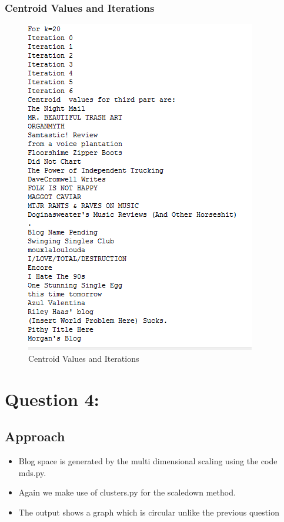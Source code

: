 \documentclass[12pt]{article}
\begin{document}
\subsubsection{Centroid Values and Iterations}
\begin{figure}[ht]
\includegraphics[scale=0.6]{../../q3/output.png}
\centering
\caption{Centroid Values and Iterations}
\label{Centroid Values and Iterations}
\end{figure}



\newpage
\section{Question 4: }
\subsection{Approach}
\begin{itemize}
\item Blog space is generated by the multi dimensional scaling using the code mds.py.
\item  Again we make use of clusters.py for the scaledown method. 
\item The output shows a graph which is circular unlike the previous question
\end{itemize}
\end{document}
